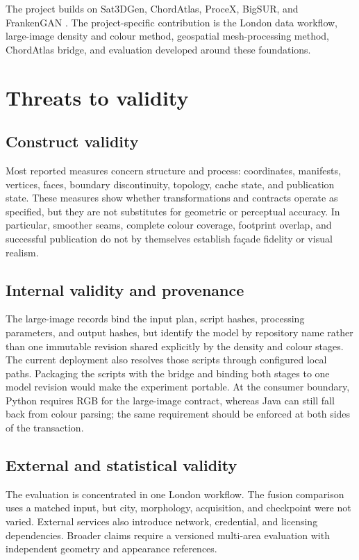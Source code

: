 The project builds on Sat3DGen, ChordAtlas, ProceX, BigSUR, and FrankenGAN
\cite{qian2026sat3dgen,kellyChordAtlas2024,kelly2011procex,
kelly2017bigsur,kelly2018frankengan}.  The project-specific contribution is the
London data workflow, large-image density and colour method, geospatial
mesh-processing method, ChordAtlas bridge, and evaluation developed around
these foundations.

\section{Threats to validity}

\subsection{Construct validity}

Most reported measures concern structure and process: coordinates, manifests,
vertices, faces, boundary discontinuity, topology, cache state, and publication
state.  These measures show whether transformations and contracts operate as
specified, but they are not substitutes for geometric or perceptual accuracy.
In particular, smoother seams, complete colour coverage, footprint overlap,
and successful publication do not by themselves establish fa\c{c}ade fidelity
or visual realism.

\subsection{Internal validity and provenance}

The large-image records bind the input plan, script hashes, processing
parameters, and output hashes, but identify the model by repository name rather
than one immutable revision shared explicitly by the density and colour
stages.  The current deployment also resolves those scripts through configured
local paths.  Packaging the scripts with the bridge and binding both stages to
one model revision would make the experiment portable.  At the consumer
boundary, Python requires RGB for the large-image contract, whereas Java can
still fall back from colour parsing; the same requirement should be enforced
at both sides of the transaction.

\subsection{External and statistical validity}

The evaluation is concentrated in one London workflow.  The fusion comparison
uses a matched input, but city, morphology, acquisition, and checkpoint were
not varied.  External services also introduce network, credential, and
licensing dependencies.  Broader claims require a versioned multi-area
evaluation with independent geometry and appearance references.

